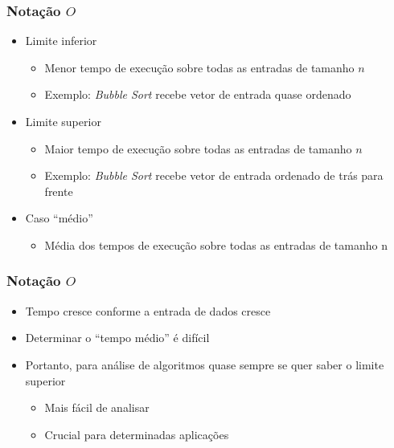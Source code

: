 \documentclass[aspectratio=169]{beamer}
\begin{document}
\begin{frame}\frametitle{Notação $O$}
\begin{itemize}
	\item Limite inferior
	\begin{itemize}
		\item Menor tempo de execução sobre todas as entradas de tamanho $n$
		\item Exemplo: \emph{Bubble Sort} recebe vetor de entrada quase ordenado
	\end{itemize}
	\item Limite superior
	\begin{itemize}
		\item Maior tempo de execução sobre todas as entradas de tamanho $n$
		\item Exemplo: \emph{Bubble Sort} recebe vetor de entrada ordenado de trás para frente
	\end{itemize}
	\item Caso ``médio''
	\begin{itemize}
		\item Média dos tempos de execução sobre todas as entradas de tamanho n
	\end{itemize}
\end{itemize}
\end{frame}

\begin{frame}\frametitle{Notação $O$}
\begin{itemize}
	\item Tempo cresce conforme a entrada de dados cresce
	\item Determinar o ``tempo médio'' é difícil
	\item Portanto, para análise de algoritmos quase sempre se quer saber o limite superior
	\begin{itemize}
		\item Mais fácil de analisar
		\item Crucial para determinadas aplicações
	\end{itemize}
\end{itemize}
\end{frame}
\end{document}
